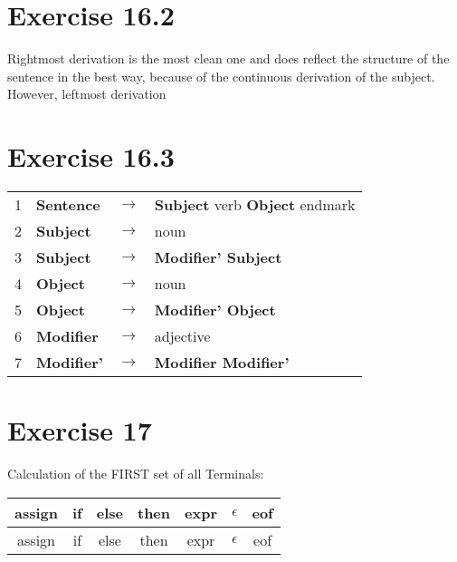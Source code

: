 \documentclass[11pt]{article} %
\begin{document}
\section*{Exercise 16.2}
Rightmost derivation is the most clean one and does reflect the structure of the sentence in the best way, because of the continuous derivation of the subject. However, leftmost derivation

\section*{Exercise 16.3}
\begin{tabular}{llcl}
1
& \textbf{Sentence}
& $\rightarrow$
& \textbf{Subject} verb \textbf{Object} endmark	\\

2
& \textbf{Subject}
& $\rightarrow$
& noun \\

3
& \textbf{Subject}
& $\rightarrow$
& \textbf{Modifier' Subject} \\

4
& \textbf{Object}
& $\rightarrow$
& noun \\

5
& \textbf{Object}
& $\rightarrow$
& \textbf{Modifier' Object} \\

6
& \textbf{Modifier}
& $\rightarrow$
& adjective \\

7
& \textbf{Modifier'}
& $\rightarrow$
& \textbf{Modifier Modifier'} \\

\end{tabular}

\section*{Exercise 17}
Calculation of the FIRST set of all Terminals:\\

\begin{tabular}{|c|c|c|c|c|c|c|} \hline 
\textbf{assign}
& \textbf{if}
& \textbf{else}
& \textbf{then}
& \textbf{expr}
& \textbf{$\epsilon$}
& \textbf{eof} \\\hline 

assign
& if
& else
& then
& expr
& $\epsilon$
& eof \\\hline 
\end{tabular} \\
\end{document}
